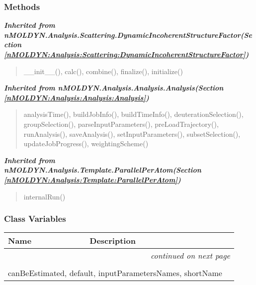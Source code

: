 
  \subsubsection{Methods}


\large{\textbf{\textit{Inherited from nMOLDYN.Analysis.Scattering.DynamicIncoherentStructureFactor\textit{(Section \ref{nMOLDYN:Analysis:Scattering:DynamicIncoherentStructureFactor})}}}}

\begin{quote}
\_\_init\_\_(), calc(), combine(), finalize(), initialize()
\end{quote}

\large{\textbf{\textit{Inherited from nMOLDYN.Analysis.Analysis.Analysis\textit{(Section \ref{nMOLDYN:Analysis:Analysis:Analysis})}}}}

\begin{quote}
analysisTime(), buildJobInfo(), buildTimeInfo(), deuterationSelection(), groupSelection(), parseInputParameters(), preLoadTrajectory(), runAnalysis(), saveAnalysis(), setInputParameters(), subsetSelection(), updateJobProgress(), weightingScheme()
\end{quote}

\large{\textbf{\textit{Inherited from nMOLDYN.Analysis.Template.ParallelPerAtom\textit{(Section \ref{nMOLDYN:Analysis:Template:ParallelPerAtom})}}}}

\begin{quote}
internalRun()
\end{quote}


  \subsubsection{Class Variables}

    \vspace{-1cm}
\hspace{\varindent}\begin{longtable}{|p{\varnamewidth}|p{\vardescrwidth}|l}
\cline{1-2}
\cline{1-2} \centering \textbf{Name} & \centering \textbf{Description}& \\
\cline{1-2}
\endhead\cline{1-2}\multicolumn{3}{r}{\small\textit{continued on next page}}\\\endfoot\cline{1-2}
\endlastfoot\multicolumn{2}{|l|}{\textit{Inherited from nMOLDYN.Analysis.Scattering.DynamicIncoherentStructureFactor \textit{(Section \ref{nMOLDYN:Analysis:Scattering:DynamicIncoherentStructureFactor})}}}\\
\multicolumn{2}{|p{\varwidth}|}{\raggedright canBeEstimated, default, inputParametersNames, shortName}\\
\cline{1-2}
\end{longtable}

